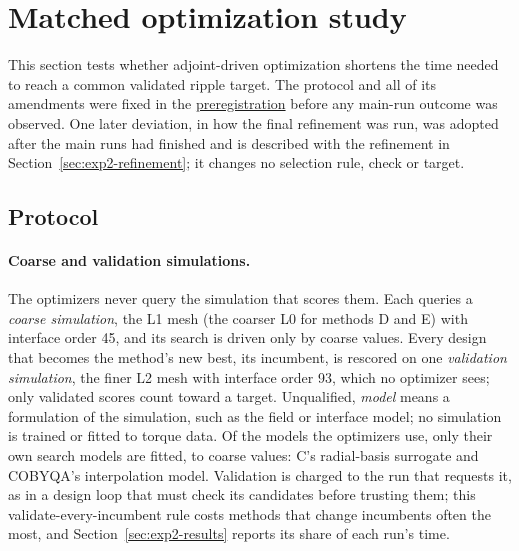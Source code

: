 \section{Matched optimization study}\label{sec:optimization}
This section tests whether adjoint-driven optimization shortens the time
needed to reach a common validated ripple target. The protocol and all of
its amendments were fixed in the
\href{https://github.com/rjwalters/geode-fem/issues/1185}{preregistration}
before any main-run outcome was observed. One later deviation, in how the
final refinement was run, was adopted after the main runs had finished and
is described with the refinement in Section~\ref{sec:exp2-refinement}; it
changes no selection rule, check or target.

\subsection{Protocol}
\paragraph{Coarse and validation simulations.}
The optimizers never query the simulation that scores them. Each queries a
\emph{coarse simulation}, the L1 mesh (the coarser L0 for methods D and E)
with interface order 45, and its search is driven only by coarse values.
Every design that becomes the method's new best, its incumbent, is rescored
on one \emph{validation simulation}, the finer L2 mesh with interface order
93, which no optimizer sees; only validated scores count toward a target.
Unqualified, \emph{model} means a formulation of the simulation, such as the
field or interface model; no simulation is trained or fitted to torque data.
Of the models the optimizers use, only their own search models are fitted,
to coarse values: C's radial-basis surrogate and COBYQA's interpolation model.
Validation is charged to the run that requests it, as in a
design loop that must check its candidates before trusting them; this
validate-every-incumbent rule costs methods that change incumbents often
the most, and Section~\ref{sec:exp2-results} reports its share of each
run's time.

